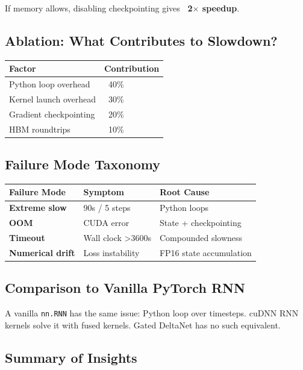 If memory allows, disabling checkpointing gives \textbf{~2$\times$ speedup}.

\subsection{Ablation: What Contributes to Slowdown?}

\begin{table}[H]
\centering
\small
\begin{tabular}{ll}
\toprule
\textbf{Factor} & \textbf{Contribution} \\
\midrule
Python loop overhead & ~40\% \\
Kernel launch overhead & ~30\% \\
Gradient checkpointing & ~20\% \\
HBM roundtrips & ~10\% \\
\bottomrule
\end{tabular}
\end{table}

\subsection{Failure Mode Taxonomy}

\begin{table}[H]
\centering
\small
\begin{tabular}{lll}
\toprule
\textbf{Failure Mode} & \textbf{Symptom} & \textbf{Root Cause} \\
\midrule
\textbf{Extreme slow} & 90s / 5 steps & Python loops \\
\textbf{OOM} & CUDA error & State + checkpointing \\
\textbf{Timeout} & Wall clock \textgreater{}3600s & Compounded slowness \\
\textbf{Numerical drift} & Loss instability & FP16 state accumulation \\
\bottomrule
\end{tabular}
\end{table}

\subsection{Comparison to Vanilla PyTorch RNN}

A vanilla \texttt{nn.RNN} has the same issue: Python loop over timesteps. cuDNN 
RNN kernels solve it with fused kernels. Gated DeltaNet has no such 
equivalent.

\subsection{Summary of Insights}


